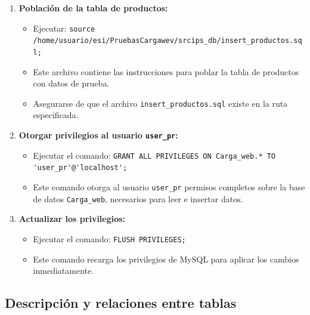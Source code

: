\documentclass[10pt]{book}
\begin{document}
\begin{enumerate}
\begin{itemize}
            \item Ejecutar: \lstinline{source /home/usuario/esi/PruebasCargawev/srcips_db/procedimientos.sql;}
            \item Este archivo contiene las instrucciones para crear los procedimientos almacenados necesarios.
            \item Verificar que el archivo \texttt{procedimientos.sql} esté presente en la ubicación indicada.
        \end{itemize}
    
        \item \textbf{Población de la tabla de productos:}
        \begin{itemize}
            \item Ejecutar: \lstinline{source /home/usuario/esi/PruebasCargawev/srcips_db/insert_productos.sql;}
            \item Este archivo contiene las instrucciones para poblar la tabla de productos con datos de prueba.
            \item Asegurarse de que el archivo \texttt{insert\_productos.sql} existe en la ruta especificada.
        \end{itemize}
    
        \item \textbf{Otorgar privilegios al usuario \texttt{user\_pr}:}
        \begin{itemize}
            \item Ejecutar el comando: \lstinline{GRANT ALL PRIVILEGES ON Carga_web.* TO 'user_pr'@'localhost';}
            \item Este comando otorga al usuario \texttt{user\_pr} permisos completos sobre la base de datos \texttt{Carga\_web}, necesarios para leer e insertar datos.
        \end{itemize}
    
        \item \textbf{Actualizar los privilegios:}
        \begin{itemize}
            \item Ejecutar el comando: \lstinline{FLUSH PRIVILEGES;}
            \item Este comando recarga los privilegios de MySQL para aplicar los cambios inmediatamente.
        \end{itemize}
    \end{enumerate}

        
\subsection{Descripción y relaciones entre tablas}
\end{document}
